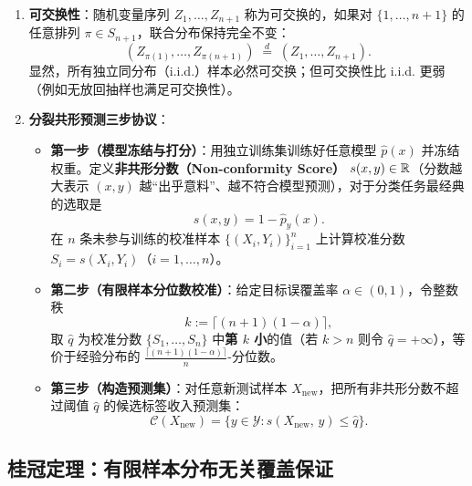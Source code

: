 \begin{defBox}
\begin{definition}\label{def:conformal}
\begin{enumerate}
  \item \textbf{可交换性}：随机变量序列 $Z_1,\dots,Z_{n+1}$ 称为可交换的，如果对 $\{1,\dots,n+1\}$ 的任意排列 $\pi \in S_{n+1}$，联合分布保持完全不变：
  \[
    (Z_{\pi(1)},\dots,Z_{\pi(n+1)}) \;\stackrel{d}{=}\; (Z_1,\dots,Z_{n+1}).
  \]
  显然，所有独立同分布（i.i.d.）样本必然可交换；但可交换性比 i.i.d. 更弱（例如无放回抽样也满足可交换性）。
  \item \textbf{分裂共形预测三步协议}：
  \begin{itemize}
    \item \textbf{第一步（模型冻结与打分）}：用独立训练集训练好任意模型 $\hat{p}(x)$ 并冻结权重。定义\textbf{非共形分数（Non-conformity Score）} $s(x, y) \in \mathbb{R}$（分数越大表示 $(x,y)$ 越“出乎意料”、越不符合模型预测），对于分类任务最经典的选取是
    \[
      s(x, y) = 1 - \hat{p}_y(x).
    \]
    在 $n$ 条未参与训练的校准样本 $\{(X_i, Y_i)\}_{i=1}^n$ 上计算校准分数 $S_i = s(X_i, Y_i)$（$i=1,\dots,n$）。
    \item \textbf{第二步（有限样本分位数校准）}：给定目标误覆盖率 $\alpha \in (0, 1)$，令整数秩
    \begin{equation}\label{eq:conformal-k}
      k := \big\lceil (n + 1)(1 - \alpha) \big\rceil,
    \end{equation}
    取 $\hat{q}$ 为校准分数 $\{S_1,\dots,S_n\}$ 中\textbf{第 $k$ 小}的值（若 $k > n$ 则令 $\hat{q} = +\infty$），等价于经验分布的 $\frac{\lceil(n+1)(1-\alpha)\rceil}{n}$-分位数。
    \item \textbf{第三步（构造预测集）}：对任意新测试样本 $X_{\text{new}}$，把所有非共形分数不超过阈值 $\hat{q}$ 的候选标签收入预测集：
    \begin{equation}\label{eq:conformal-set}
      \mathcal{C}(X_{\text{new}}) = \big\{ y \in \mathcal{Y} : s(X_{\text{new}},\, y) \le \hat{q} \big\}.
    \end{equation}
  \end{itemize}
\end{enumerate}
\end{definition}
\end{defBox}

\subsection{桂冠定理：有限样本分布无关覆盖保证}

